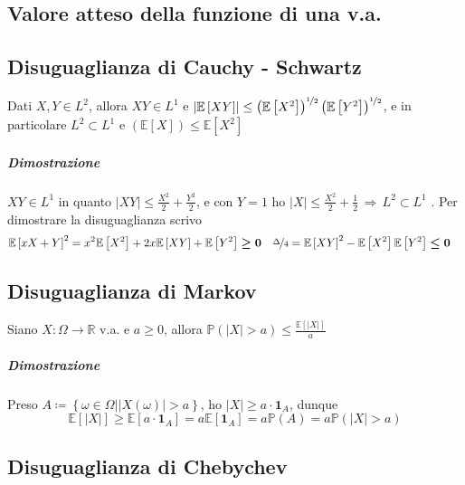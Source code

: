 \documentclass[a4paper,10pt]{article}
\theoremstyle{remark}
\theoremstyle{definition}
\begin{document}
\subsection*{Valore atteso della funzione di una v.a.}

\subsection*{Disuguaglianza di Cauchy - Schwartz}

Dati $X,Y\in L^{2}$, allora $XY\in L^{1}$ e $\left|\mathbb{E}\left[XY\right]\right|\leq\left(\mathbb{E}\left[X^{2}\right]\right)^{\nicefrac{1}{2}}\left(\mathbb{E}\left[Y^{2}\right]\right)^{\nicefrac{1}{2}}$,
e in particolare $L^{2}\subset L^{1}$ e $\left(\mathbb{E}\left[X\right]\right)\leq\mathbb{E}\left[X^{2}\right]$

\subparagraph*{Dimostrazione}

$XY\in L^{1}$ in quanto $\left|XY\right|\leq\frac{X^{2}}{2}+\frac{Y^{2}}{2}$,
e con $Y=1$ ho $\left|X\right|\leq\frac{X^{2}}{2}+\frac{1}{2}\,\Rightarrow\,L^{2}\subset L^{1}$
. Per dimostrare la disuguaglianza scrivo
\begin{align*}
\mathbb{E}\left[xX+Y\right]^{2} & =x^{2}\mathbb{E}\left[X^{2}\right]+2x\mathbb{E}\left[XY\right]+\mathbb{E}\left[Y^{2}\right]\boldsymbol{\geq0} & \nicefrac{\Delta}{4} & =\mathbb{E}\left[XY\right]^{2}-\mathbb{E}\left[X^{2}\right]\mathbb{E}\left[Y^{2}\right]\boldsymbol{\leq0}
\end{align*}

\subsection*{Disuguaglianza di Markov}

Siano $X:\Omega\longrightarrow\mathbb{R}$ v.a. e $a\geq0$, allora
$\mathbb{P}\left(\left|X\right|>a\right)\leq\frac{\mathbb{E}\left[\left|X\right|\right]}{a}$

\subparagraph*{Dimostrazione}

Preso $A\coloneqq\left\{ \omega\in\Omega|\left|X\left(\omega\right)\right|>a\right\} $,
ho $\left|X\right|\geq a\cdot\boldsymbol{1}_{A}$, dunque
\[
\mathbb{E}\left[\left|X\right|\right]\geq\mathbb{E}\left[a\cdot\boldsymbol{1}_{A}\right]=a\mathbb{E}\left[\boldsymbol{1}_{A}\right]=a\mathbb{P}\left(A\right)=a\mathbb{P}\left(\left|X\right|>a\right)
\]


\subsection*{Disuguaglianza di Chebychev}
\end{document}
